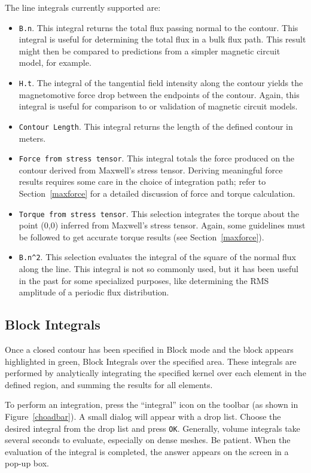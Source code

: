 \documentclass[12pt]{report}
\begin{document}
The line integrals currently supported are:
\begin{itemize}
\item {\tt B.n}.  This integral returns the total flux passing normal
to the contour.  This integral is useful for determining the total
flux in a bulk flux path.  This result might then be compared to
predictions from a simpler magnetic circuit model, for example.
\item {\tt H.t}. The integral of the tangential field intensity along
the contour yields the magnetomotive force drop between the
endpoints of the contour.  Again, this integral is useful for
comparison to or validation of magnetic circuit models.
\item {\tt Contour Length}.  This integral returns the length of
the defined contour in meters.
\item {\tt Force from stress tensor}.  This integral totals the
force produced on the contour derived from Maxwell's stress tensor.
Deriving meaningful force results requires some care in the choice
of integration path; refer to Section~\ref{maxforce} for a detailed
discussion of force and torque calculation.
\item {\tt Torque from stress tensor}.  This selection integrates
the torque about the point (0,0) inferred from Maxwell's stress
tensor.  Again, some guidelines must be followed to get accurate
torque results (see Section~\ref{maxforce}).
\item \verb+B.n^2+.  This selection evaluates the integral of the
square of the normal flux along the line.  This integral is not so
commonly used, but it has been useful in the past for some
specialized purposes, like determining the RMS amplitude of a
periodic flux distribution.
\end{itemize}

\subsection{Block Integrals}
Once a closed contour has been specified in Block mode and the
block appears highlighted in green, Block Integrals over the
specified area. These integrals are performed by analytically
integrating the specified kernel over each element in the defined
region, and summing the results for all elements.

To perform an integration, press the ``integral'' icon on the
toolbar (as shown in Figure~\ref{choadbar}).  A small dialog will
appear with a drop list.  Choose the desired integral from the drop
list and press {\tt OK}.  Generally, volume integrals take several
seconds to evaluate, especially on dense meshes.  Be patient. When
the evaluation of the integral is completed, the answer appears on
the screen in a pop-up box.
\end{document}
